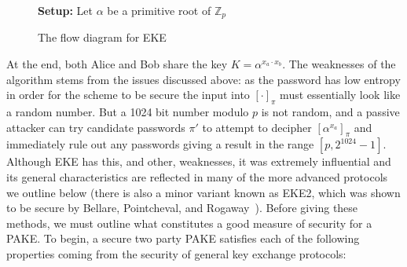 \documentclass{amsart}
\theoremstyle{remark}
\begin{document}
\begin{figure}[h]
\textbf{Setup:} Let $\alpha$ be a primitive root of $\mathbb{Z}_p$
    \caption{The flow diagram for EKE}
    \label{fig:EKE}
\end{figure}

At the end, both Alice and Bob share the key $K = \alpha^{x_a \cdot x_b}$.  The weaknesses of the algorithm 
stems from the issues discussed above: as the password has low entropy in order for the scheme to be 
secure the input into $[\cdot]_{\pi}$ must essentially look like a random number.  But a 1024 bit number 
modulo $p$ is not random, and a passive attacker can try candidate passwords $\pi'$ to attempt to decipher 
$\left[\alpha^{x_a}\right]_{\pi}$ and immediately rule out any passwords giving a result in the range $[p,2^{1024}-1]$.
\\

Although EKE has this, and other, weaknesses, it was extremely influential and its general characteristics are 
reflected in many of the more advanced protocols we outline below (there is also a minor variant known as EKE2,
which was shown to be secure by Bellare, Pointcheval, and Rogaway~\cite{BePoRo00}).  Before giving these methods, we must outline 
what constitutes a good measure of security for a PAKE. To begin, a secure two party PAKE satisfies each of the following properties
coming from the security of general key exchange protocols:
\\
\end{document}
